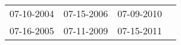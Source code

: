\begin{supertabular}{llll}
 07-10-2004 &  07-15-2006 &  07-09-2010 \\
 07-16-2005 &  07-11-2009 &  07-15-2011 \\
\end{supertabular}
